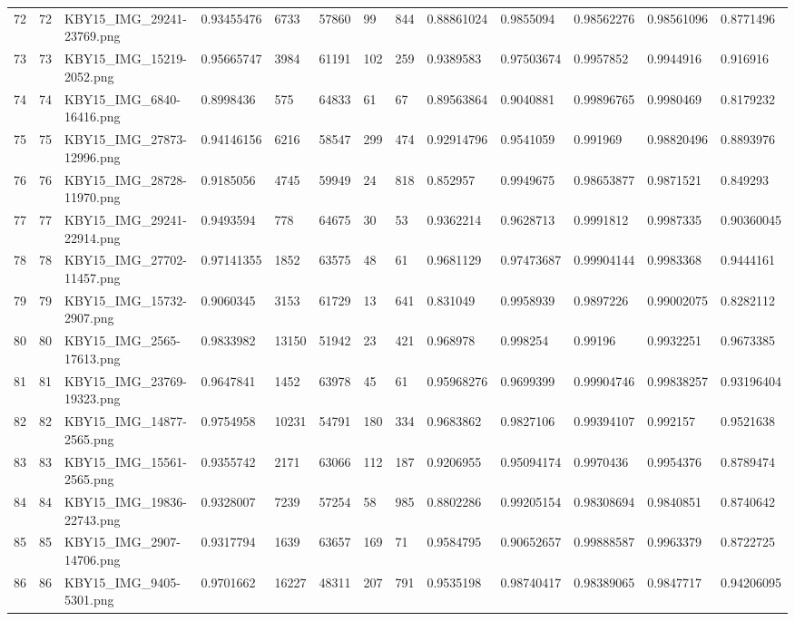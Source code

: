\documentclass[11pt, a4paper, twoside]{report}
\begin{document}
\begin{longtable}[c]{@{}lllllllllllll@{}}
72 & 72 & KBY15\_IMG\_29241-23769.png & 0.93455476 & 6733 & 57860 & 99 & 844 & 0.88861024 & 0.9855094 & 0.98562276 & 0.98561096 & 0.8771496 \\
73 & 73 & KBY15\_IMG\_15219-2052.png & 0.95665747 & 3984 & 61191 & 102 & 259 & 0.9389583 & 0.97503674 & 0.9957852 & 0.9944916 & 0.916916 \\
74 & 74 & KBY15\_IMG\_6840-16416.png & 0.8998436 & 575 & 64833 & 61 & 67 & 0.89563864 & 0.9040881 & 0.99896765 & 0.9980469 & 0.8179232 \\
75 & 75 & KBY15\_IMG\_27873-12996.png & 0.94146156 & 6216 & 58547 & 299 & 474 & 0.92914796 & 0.9541059 & 0.991969 & 0.98820496 & 0.8893976 \\
76 & 76 & KBY15\_IMG\_28728-11970.png & 0.9185056 & 4745 & 59949 & 24 & 818 & 0.852957 & 0.9949675 & 0.98653877 & 0.9871521 & 0.849293 \\
77 & 77 & KBY15\_IMG\_29241-22914.png & 0.9493594 & 778 & 64675 & 30 & 53 & 0.9362214 & 0.9628713 & 0.9991812 & 0.9987335 & 0.90360045 \\
78 & 78 & KBY15\_IMG\_27702-11457.png & 0.97141355 & 1852 & 63575 & 48 & 61 & 0.9681129 & 0.97473687 & 0.99904144 & 0.9983368 & 0.9444161 \\
79 & 79 & KBY15\_IMG\_15732-2907.png & 0.9060345 & 3153 & 61729 & 13 & 641 & 0.831049 & 0.9958939 & 0.9897226 & 0.99002075 & 0.8282112 \\
80 & 80 & KBY15\_IMG\_2565-17613.png & 0.9833982 & 13150 & 51942 & 23 & 421 & 0.968978 & 0.998254 & 0.99196 & 0.9932251 & 0.9673385 \\
81 & 81 & KBY15\_IMG\_23769-19323.png & 0.9647841 & 1452 & 63978 & 45 & 61 & 0.95968276 & 0.9699399 & 0.99904746 & 0.99838257 & 0.93196404 \\
82 & 82 & KBY15\_IMG\_14877-2565.png & 0.9754958 & 10231 & 54791 & 180 & 334 & 0.9683862 & 0.9827106 & 0.99394107 & 0.992157 & 0.9521638 \\
83 & 83 & KBY15\_IMG\_15561-2565.png & 0.9355742 & 2171 & 63066 & 112 & 187 & 0.9206955 & 0.95094174 & 0.9970436 & 0.9954376 & 0.8789474 \\
84 & 84 & KBY15\_IMG\_19836-22743.png & 0.9328007 & 7239 & 57254 & 58 & 985 & 0.8802286 & 0.99205154 & 0.98308694 & 0.9840851 & 0.8740642 \\
85 & 85 & KBY15\_IMG\_2907-14706.png & 0.9317794 & 1639 & 63657 & 169 & 71 & 0.9584795 & 0.90652657 & 0.99888587 & 0.9963379 & 0.8722725 \\
86 & 86 & KBY15\_IMG\_9405-5301.png & 0.9701662 & 16227 & 48311 & 207 & 791 & 0.9535198 & 0.98740417 & 0.98389065 & 0.9847717 & 0.94206095 \\

\end{longtable}
\end{document}
